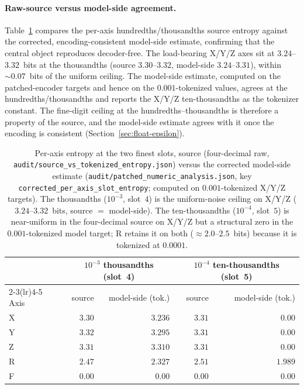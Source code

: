\documentclass[entropy,article,submit,moreauthors,pdftex]{Definitions/mdpi}
\begin{document}
\paragraph{Raw-source versus model-side agreement.} Table~\ref{tab:raw_vs_npz} compares the per-axis hundredths/thousandths source entropy against the corrected, encoding-consistent model-side estimate, confirming that the central object reproduces decoder-free. The load-bearing X/Y/Z axes sit at $3.24$--$3.32$~bits at the thousandths (source $3.30$--$3.32$, model-side $3.24$--$3.31$), within $\sim\!0.07$~bits of the uniform ceiling. The model-side estimate, computed on the patched-encoder targets and hence on the $0.001$-tokenized values, agrees at the hundredths/thousandths and reports the X/Y/Z ten-thousandths as the tokenizer constant. The fine-digit ceiling at the hundredths--thousandths is therefore a property of the source, and the model-side estimate agrees with it once the encoding is consistent (Section~\ref{sec:float-epsilon}).

\begin{table}[ht]
\centering
\caption{Per-axis entropy at the two finest slots, source (four-decimal raw, \texttt{audit/source\_vs\_tokenized\_entropy.json}) versus the corrected model-side estimate (\texttt{audit/patched\_numeric\_analysis.json}, key \texttt{corrected\_per\_axis\_slot\_entropy}; computed on $0.001$-tokenized X/Y/Z targets). The thousandths ($10^{-3}$, slot~$4$) is the uniform-noise ceiling on X/Y/Z ($3.24$--$3.32$~bits, source $=$ model-side). The ten-thousandths ($10^{-4}$, slot~$5$) is near-uniform in the four-decimal source on X/Y/Z but a structural zero in the $0.001$-tokenized model target; R retains it on both ($\approx 2.0$--$2.5$~bits) because it is tokenized at $0.0001$.}
\label{tab:raw_vs_npz}
\begin{tabular}{l r r r r}
\toprule
& \multicolumn{2}{c}{$10^{-3}$ thousandths (slot~4)} & \multicolumn{2}{c}{$10^{-4}$ ten-thousandths (slot~5)} \\
\cmidrule(lr){2-3}\cmidrule(lr){4-5}
Axis & source & model-side (tok.) & source & model-side (tok.) \\
\midrule
X & $3.30$ & $3.236$ & $3.31$ & $0.00$ \\
Y & $3.32$ & $3.295$ & $3.31$ & $0.00$ \\
Z & $3.31$ & $3.310$ & $3.31$ & $0.00$ \\
R & $2.47$ & $2.327$ & $2.51$ & $1.989$ \\
F & $0.00$ & $0.00$  & $0.00$ & $0.00$ \\
\bottomrule
\end{tabular}
\end{table}
\end{document}
